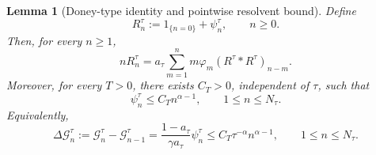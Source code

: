 \documentclass[letterpaper]{article}
\numberwithin{equation}{section}
\newtheorem{lemma}[theorem]{Lemma}
\theoremstyle{definition}
\theoremstyle{remark}
\begin{document}
\begin{lemma}[Doney-type identity and pointwise resolvent bound]
\label{lem:psi-pointwise}
Define
\[
  R_n^\tau:=1_{\{n=0\}}+\psi_n^\tau,
  \qquad n\ge0.
\]
Then, for every $n\ge1$,
\begin{equation}\label{eq:doney-identity}
  nR_n^\tau
  =
  a_\tau\sum_{m=1}^n m\varphi_m(R^\tau*R^\tau)_{n-m}.
\end{equation}
Moreover, for every $T>0$, there exists $C_T>0$, independent of $\tau$, such
that
\begin{equation}\label{eq:psi-pointwise}
  \psi_n^\tau\le C_T n^{\alpha-1},
  \qquad 1\le n\le N_\tau.
\end{equation}
Equivalently,
\begin{equation}\label{eq:G-increment-pointwise}
  \Delta\mathcal G_n^\tau
  :=
  \mathcal G_n^\tau-\mathcal G_{n-1}^\tau
  =
  \frac{1-a_\tau}{\gamma a_\tau}\psi_n^\tau
  \le C_T\tau^{-\alpha}n^{\alpha-1},
  \qquad 1\le n\le N_\tau.
\end{equation}
\end{lemma}
\end{document}
